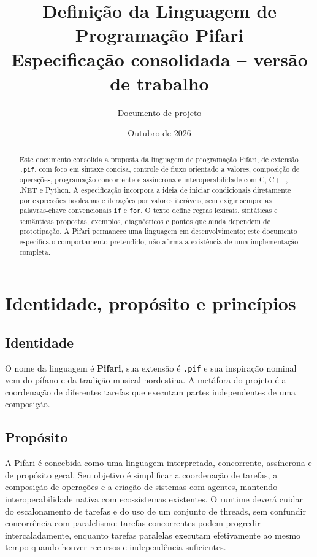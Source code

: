 \documentclass[12pt,a4paper]{article}
\title{\textbf{Definição da Linguagem de Programação Pifari}\\
\large Especificação consolidada -- versão de trabalho}
\author{Documento de projeto}
\date{Outubro de 2026}
\begin{document}
\maketitle
\begin{abstract}
Este documento consolida a proposta da linguagem de programação Pifari, de extensão \texttt{.pif}, com foco em sintaxe concisa, controle de fluxo orientado a valores, composição de operações, programação concorrente e assíncrona e interoperabilidade com C, C++, .NET e Python. A especificação incorpora a ideia de iniciar condicionais diretamente por expressões booleanas e iterações por valores iteráveis, sem exigir sempre as palavras-chave convencionais \texttt{if} e \texttt{for}. O texto define regras lexicais, sintáticas e semânticas propostas, exemplos, diagnósticos e pontos que ainda dependem de prototipação. A Pifari permanece uma linguagem em desenvolvimento; este documento especifica o comportamento pretendido, não afirma a existência de uma implementação completa.
\end{abstract}
\tableofcontents
\newpage

\section{Identidade, propósito e princípios}
\subsection{Identidade}
O nome da linguagem é \textbf{Pifari}, sua extensão é \texttt{.pif} e sua inspiração nominal vem do pífano e da tradição musical nordestina. A metáfora do projeto é a coordenação de diferentes tarefas que executam partes independentes de uma composição.

\subsection{Propósito}
A Pifari é concebida como uma linguagem interpretada, concorrente, assíncrona e de propósito geral. Seu objetivo é simplificar a coordenação de tarefas, a composição de operações e a criação de sistemas com agentes, mantendo interoperabilidade nativa com ecossistemas existentes. O runtime deverá cuidar do escalonamento de tarefas e do uso de um conjunto de threads, sem confundir concorrência com paralelismo: tarefas concorrentes podem progredir intercaladamente, enquanto tarefas paralelas executam efetivamente ao mesmo tempo quando houver recursos e independência suficientes.
\end{document}
